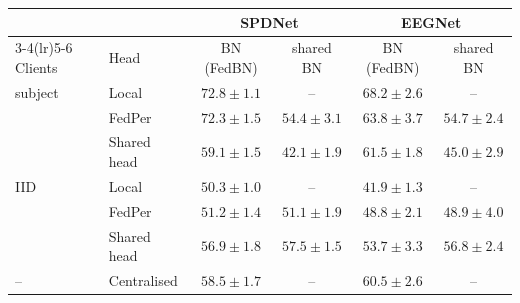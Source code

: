\begin{tabular}{llcccc}
\toprule
 & & \multicolumn{2}{c}{SPDNet} & \multicolumn{2}{c}{EEGNet} \\
\cmidrule(lr){3-4}\cmidrule(lr){5-6}
Clients & Head & BN (FedBN) & shared BN & BN (FedBN) & shared BN \\
\midrule
subject & Local & $\mathbf{72.8} \pm 1.1$ & -- & $\mathbf{68.2} \pm 2.6$ & -- \\
 & FedPer & $\mathbf{72.3} \pm 1.5$ & $54.4 \pm 3.1$ & $\mathbf{63.8} \pm 3.7$ & $54.7 \pm 2.4$ \\
 & Shared head & $\mathbf{59.1} \pm 1.5$ & $42.1 \pm 1.9$ & $\mathbf{61.5} \pm 1.8$ & $45.0 \pm 2.9$ \\
\midrule
IID & Local & $\mathbf{50.3} \pm 1.0$ & -- & $\mathbf{41.9} \pm 1.3$ & -- \\
 & FedPer & $\mathbf{51.2} \pm 1.4$ & $51.1 \pm 1.9$ & $48.8 \pm 2.1$ & $\mathbf{48.9} \pm 4.0$ \\
 & Shared head & $56.9 \pm 1.8$ & $\mathbf{57.5} \pm 1.5$ & $53.7 \pm 3.3$ & $\mathbf{56.8} \pm 2.4$ \\
\midrule
-- & Centralised & $\mathbf{58.5} \pm 1.7$ & -- & $\mathbf{60.5} \pm 2.6$ & -- \\
\bottomrule
\end{tabular}
